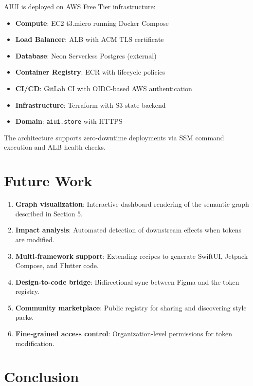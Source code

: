\documentclass[11pt,twocolumn]{article}
\begin{document}
AIUI is deployed on AWS Free Tier infrastructure:

\begin{itemize}[nosep]
  \item \textbf{Compute}: EC2 t3.micro running Docker Compose
  \item \textbf{Load Balancer}: ALB with ACM TLS certificate
  \item \textbf{Database}: Neon Serverless Postgres (external)
  \item \textbf{Container Registry}: ECR with lifecycle policies
  \item \textbf{CI/CD}: GitLab CI with OIDC-based AWS authentication
  \item \textbf{Infrastructure}: Terraform with S3 state backend
  \item \textbf{Domain}: \texttt{aiui.store} with HTTPS
\end{itemize}

The architecture supports zero-downtime deployments via SSM command execution and ALB health checks.

\section{Future Work}

\begin{enumerate}[nosep]
  \item \textbf{Graph visualization}: Interactive dashboard rendering of the semantic graph described in Section 5.
  \item \textbf{Impact analysis}: Automated detection of downstream effects when tokens are modified.
  \item \textbf{Multi-framework support}: Extending recipes to generate SwiftUI, Jetpack Compose, and Flutter code.
  \item \textbf{Design-to-code bridge}: Bidirectional sync between Figma and the token registry.
  \item \textbf{Community marketplace}: Public registry for sharing and discovering style packs.
  \item \textbf{Fine-grained access control}: Organization-level permissions for token modification.
\end{enumerate}

\section{Conclusion}
\end{document}
